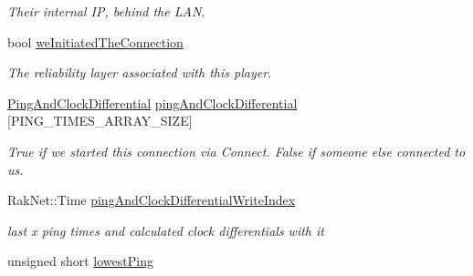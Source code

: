 \begin{DoxyCompactItemize}
\begin{DoxyCompactList}\small\item\em Their internal I\-P, behind the L\-A\-N. \end{DoxyCompactList}\item 
\hypertarget{struct_rak_net_1_1_rak_peer_1_1_remote_system_struct_a38f2cb6c9ece14d72379ec929d9f5548}{bool \hyperlink{struct_rak_net_1_1_rak_peer_1_1_remote_system_struct_a38f2cb6c9ece14d72379ec929d9f5548}{we\-Initiated\-The\-Connection}}\label{struct_rak_net_1_1_rak_peer_1_1_remote_system_struct_a38f2cb6c9ece14d72379ec929d9f5548}

\begin{DoxyCompactList}\small\item\em The reliability layer associated with this player. \end{DoxyCompactList}\item 
\hypertarget{struct_rak_net_1_1_rak_peer_1_1_remote_system_struct_a4430a6a61278c7071b7b5dffd267b531}{\hyperlink{struct_rak_net_1_1_rak_peer_1_1_ping_and_clock_differential}{Ping\-And\-Clock\-Differential} \hyperlink{struct_rak_net_1_1_rak_peer_1_1_remote_system_struct_a4430a6a61278c7071b7b5dffd267b531}{ping\-And\-Clock\-Differential} \mbox{[}P\-I\-N\-G\-\_\-\-T\-I\-M\-E\-S\-\_\-\-A\-R\-R\-A\-Y\-\_\-\-S\-I\-Z\-E\mbox{]}}\label{struct_rak_net_1_1_rak_peer_1_1_remote_system_struct_a4430a6a61278c7071b7b5dffd267b531}

\begin{DoxyCompactList}\small\item\em True if we started this connection via Connect. False if someone else connected to us. \end{DoxyCompactList}\item 
\hypertarget{struct_rak_net_1_1_rak_peer_1_1_remote_system_struct_a42d746998fc993e858bc05a345d669e4}{Rak\-Net\-::\-Time \hyperlink{struct_rak_net_1_1_rak_peer_1_1_remote_system_struct_a42d746998fc993e858bc05a345d669e4}{ping\-And\-Clock\-Differential\-Write\-Index}}\label{struct_rak_net_1_1_rak_peer_1_1_remote_system_struct_a42d746998fc993e858bc05a345d669e4}

\begin{DoxyCompactList}\small\item\em last x ping times and calculated clock differentials with it \end{DoxyCompactList}\item 
\hypertarget{struct_rak_net_1_1_rak_peer_1_1_remote_system_struct_a93c21d765397a20aaee29f90d0f82f5f}{unsigned short \hyperlink{struct_rak_net_1_1_rak_peer_1_1_remote_system_struct_a93c21d765397a20aaee29f90d0f82f5f}{lowest\-Ping}}\label{struct_rak_net_1_1_rak_peer_1_1_remote_system_struct_a93c21d765397a20aaee29f90d0f82f5f}


\end{DoxyCompactItemize}
